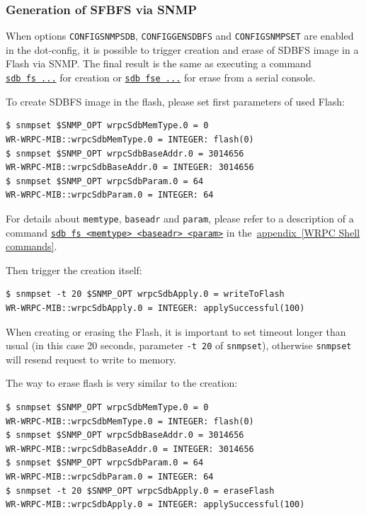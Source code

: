 \documentclass[a4paper, 12pt]{article}
\renewcommand{\_}{\underscore\allowbreak}
\begin{document}
\subsubsection{Generation of SFBFS via SNMP}
\label{Generation of SFBFS via SNMP}
When options \texttt{CONFIG\_SNMP\_SDB}, \texttt{CONFIG\_GENSDBFS}
and \texttt{CONFIG\_SNMP\_SET}
are enabled in the dot-config, it is possible to trigger creation and erase
of SDBFS image in a Flash via SNMP. The final result is the same as executing
a command \hyperlink{cmd sdb fs}{\texttt{sdb~fs~...}} for creation or
\hyperlink{cmd sdb fse}{\texttt{sdb~fse~...}} for erase from a serial console.

To create SDBFS image in the flash, please set first parameters of used Flash:
\begin{lstlisting}
$ snmpset $SNMP_OPT wrpcSdbMemType.0 = 0
WR-WRPC-MIB::wrpcSdbMemType.0 = INTEGER: flash(0)
$ snmpset $SNMP_OPT wrpcSdbBaseAddr.0 = 3014656
WR-WRPC-MIB::wrpcSdbBaseAddr.0 = INTEGER: 3014656
$ snmpset $SNMP_OPT wrpcSdbParam.0 = 64
WR-WRPC-MIB::wrpcSdbParam.0 = INTEGER: 64
\end{lstlisting}
For details about \texttt{memtype}, \texttt{baseadr} and \texttt{param}, please
refer to a description of a command
\hyperlink{cmd sdb fs}{\texttt{sdb fs <memtype> <baseadr> <param>}}
in the~\hyperlink{cmd sdb fs}{appendix~\ref{WRPC Shell commands}}.

Then trigger the creation itself:
\begin{lstlisting}
$ snmpset -t 20 $SNMP_OPT wrpcSdbApply.0 = writeToFlash
WR-WRPC-MIB::wrpcSdbApply.0 = INTEGER: applySuccessful(100)
\end{lstlisting}
When creating or erasing the Flash, it is important to set timeout longer than
usual (in this case 20 seconds, parameter \texttt{-t 20} of \texttt{snmpset}),
otherwise \texttt{snmpset} will resend request to write to memory.

The way to erase flash is very similar to the creation:
\begin{lstlisting}
$ snmpset $SNMP_OPT wrpcSdbMemType.0 = 0
WR-WRPC-MIB::wrpcSdbMemType.0 = INTEGER: flash(0)
$ snmpset $SNMP_OPT wrpcSdbBaseAddr.0 = 3014656
WR-WRPC-MIB::wrpcSdbBaseAddr.0 = INTEGER: 3014656
$ snmpset $SNMP_OPT wrpcSdbParam.0 = 64
WR-WRPC-MIB::wrpcSdbParam.0 = INTEGER: 64
$ snmpset -t 20 $SNMP_OPT wrpcSdbApply.0 = eraseFlash
WR-WRPC-MIB::wrpcSdbApply.0 = INTEGER: applySuccessful(100)
\end{lstlisting}
\end{document}

